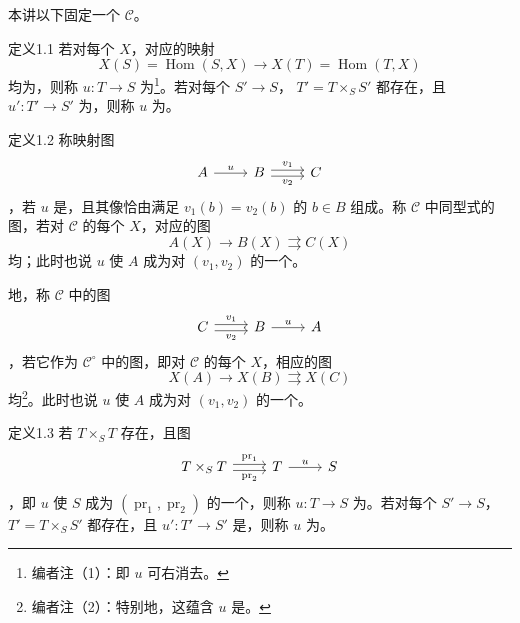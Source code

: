 本讲以下固定一个 $\mathcal C$。
\begin{SGAresult}{定义}{1.1}
若对每个 $X$，对应的映射
\[
 X(S)=\operatorname{Hom}(S,X)\longrightarrow X(T)=\operatorname{Hom}(T,X)
\]
均为，则称 $u:T\to S$ 为\footnote{编者注（1）：即 $u$ 可右消去。}。若对每个 $S'\to S$， $T'=T\times_S S'$ 都存在，且 $u':T'\to S'$ 为，则称 $u$ 为。
\end{SGAresult}
\begin{SGAresult}{定义}{1.2}
称映射图
\[
\begin{tikzcd}A\arrow[r,"u"]&B\arrow[r,shift left=.5ex,"v_1"]\arrow[r,shift right=.5ex,"v_2"']&C\end{tikzcd}
\]
，若 $u$ 是，且其像恰由满足 $v_1(b)=v_2(b)$ 的 $b\in B$ 组成。称 $\mathcal C$ 中同型式的图，若对 $\mathcal C$ 的每个 $X$，对应的图
\[
 A(X)\longrightarrow B(X)\rightrightarrows C(X)
\]
均；此时也说 $u$ 使 $A$ 成为对 $(v_1,v_2)$ 的一个。

地，称 $\mathcal C$ 中的图
\[
\begin{tikzcd}C\arrow[r,shift left=.5ex,"v_1"]\arrow[r,shift right=.5ex,"v_2"']&B\arrow[r,"u"]&A\end{tikzcd}
\]
，若它作为 $\mathcal C^\circ$ 中的图，即对 $\mathcal C$ 的每个 $X$，相应的图
\[
 X(A)\longrightarrow X(B)\rightrightarrows X(C)
\]
均\footnote{编者注（2）：特别地，这蕴含 $u$ 是。}。此时也说 $u$ 使 $A$ 成为对 $(v_1,v_2)$ 的一个。
\end{SGAresult}
\begin{SGAresult}{定义}{1.3}
若 $T\times_S T$ 存在，且图
\[
\begin{tikzcd}T\times_S T\arrow[r,shift left=.5ex,"\operatorname{pr}_1"]\arrow[r,shift right=.5ex,"\operatorname{pr}_2"']&T\arrow[r,"u"]&S\end{tikzcd}
\]
，即 $u$ 使 $S$ 成为 $(\operatorname{pr}_1,\operatorname{pr}_2)$ 的一个，则称 $u:T\to S$ 为。若对每个 $S'\to S$， $T'=T\times_S S'$ 都存在，且 $u':T'\to S'$ 是，则称 $u$ 为。
\end{SGAresult}
